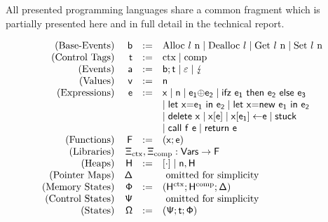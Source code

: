 \documentclass[dvipsnames,conference]{IEEEtran}
\theoremstyle{definition}
\begin{document}
All presented programming languages share a common fragment which is partially presented here and in full detail in the technical report. 

{
  \renewcommand{\src}[1]{\mathsf{#1}}
 \small
\[
  \begin{array}{rrcl}
    \text{(Base-Events)} & \src{\preevent} &:=& \src{\ev{Alloc \loc\ n}} \mid \src{\ev{Dealloc \loc}} \mid \src{\ev{Get \loc\ n}} \mid \src{\ev{Set \loc\ n}} \\
    \text{(Control Tags)} & \src{\sandboxtag{}} &:=& \src{\ctx} \mid \src{\comp} \\
    \text{(Events)} & \src{\event} &:=& \src{\preevent;\sandboxtag{}} \mid \src{\emptyevent} \mid \src{\lightning} \\ 
    \text{(Values)} & \src{v} &:=& \src{n} \\
    \text{(Expressions)} & \src{\expr} &:=& \src{x} \mid \src{n} \mid \src{\lbinop{\expr[_1]}{\expr[_2]}} \mid \src{\lifz{\expr[_1]}{\expr[_2]}{\expr[_3]}} \\ 
                         &&&\mid \src{\llet{x}{\expr[_1]}{\expr[_2]}} \mid \src{\llet{x}{new\ \expr[_1]}{\expr[_2]}} \\
                         &&&\mid \src{\ldelete{x}} \mid \src{\lget{x}{\expr}} \mid \src{\lset{x}{\expr[_1]}{\expr[]}} \mid \src{stuck}\\
                         &&&\mid \src{\lcall{f}{\expr}} \mid \src{\lreturn{\expr}} \\
    \text{(Functions)} & \src{F} &:=& (\src{x};\src{\expr}) \\
    \text{(Libraries)} &&&\hspace{-3.8em} \src{\library_{\ctx}},\src{\library_{\comp}} : \src{Vars} \to \src{F} 
     \\
    \text{(Heaps)} & \src{H} &:=& \src{\hole{\cdot}} \mid \src{n},\src{H}
    \\
    \text{(Pointer Maps)} & \src{\Delta} && \text{ omitted for simplicity}
    \\
    \text{(Memory States)} & \src{\memstate} &:=& \left(\src{H^{\ctx}};\src{H^{\comp}};\src{\Delta}\right)\\
    \text{(Control States)} & \src{\cfstate} & & \text{ omitted for simplicity} 
    \\
    \text{(States)} &\src{\Omega} &:=& \left(\src{\cfstate};\src{\sandboxtag{}};\src{\memstate}\right)\\
  \end{array}
\]
}
\end{document}
